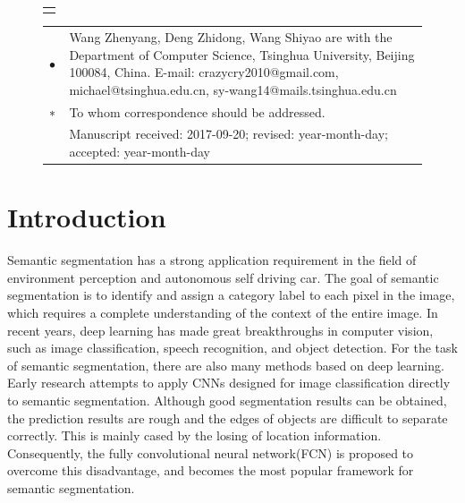 \documentclass[10.5pt,compsoc]{TsT}
\newcommand{\upcite}[1]{\superscript{\textsuperscript{\cite{#1}}}}
\theoremstyle{mystyle}
\newcommand{\upcite}[1]{\textsuperscript{\cite{#1}}}
\begin{document}
{\begin{strip}
{\begin{tabular}{p{160mm}}
\end{tabular}
}
\vskip 6mm

\vskip -3mm
\end{strip}


\thispagestyle{plain}%
\thispagestyle{empty}%
\makeatother
\pagestyle{tstheadings}

\begin{figure}[b]
\vskip -6mm
\begin{tabular}{p{44mm}}
\toprule\\
\end{tabular}
\vskip -4.5mm
\noindent
\setlength{\tabcolsep}{1pt}
\begin{tabular}{p{1.5mm}p{79.5mm}}
$\bullet$& Wang Zhenyang, Deng Zhidong, Wang Shiyao are with the Department of Computer Science, Tsinghua University, Beijing 100084, China. E-mail: crazycry2010@gmail.com, michael@tsinghua.edu.cn, sy-wang14@mails.tsinghua.edu.cn \\
$\sf{*}$&
To whom correspondence should be addressed. \\
          &          Manuscript received: 2017-09-20; revised: year-month-day; accepted: year-month-day

\end{tabular}
\end{figure}



\section{Introduction}
\label{s:introduction}
\noindent

Semantic segmentation has a strong application requirement in the field of environment perception and autonomous self driving car. The goal of semantic segmentation is to identify and assign a category label to each pixel in the image, which requires a complete understanding of the context of the entire image. In recent years, deep learning has made great breakthroughs in computer vision, such as image classification\upcite{1}, speech recognition\upcite{2}, and object detection\upcite{3}. For the task of semantic segmentation, there are also many methods based on deep learning. Early research attempts to apply CNNs designed for image classification directly to semantic segmentation. Although good segmentation results can be obtained, the prediction results are rough and the edges of objects are difficult to separate correctly. This is mainly cased by the losing of location information. Consequently, the fully convolutional neural network(FCN)\upcite{4} is proposed to overcome this disadvantage, and becomes the most popular framework for semantic segmentation.

}
\end{document}
